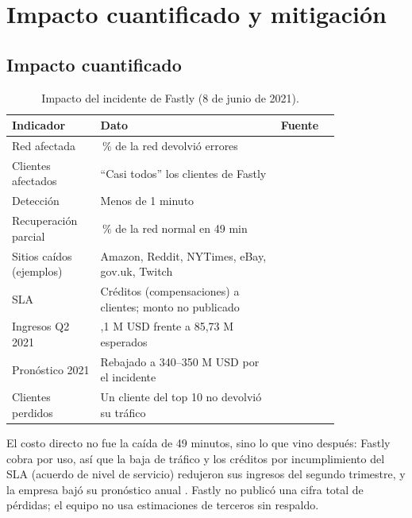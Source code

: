 
\section*{Impacto cuantificado y mitigación}

\subsection*{Impacto cuantificado}

\begin{table}[h]
\centering
\small
\begin{tabular}{@{}>{\raggedright\arraybackslash}p{0.27\linewidth}>{\raggedright\arraybackslash}p{0.55\linewidth}l@{}}
\toprule
\textbf{Indicador} & \textbf{Dato} & \textbf{Fuente} \\
\midrule
Red afectada & 85\,\% de la red devolvió errores & \cite{fastly2021} \\
Clientes afectados & ``Casi todos'' los clientes de Fastly & \cite{fastly2021q2} \\
Detección & Menos de 1 minuto & \cite{fastly2021q2} \\
Recuperación parcial & 95\,\% de la red normal en 49 min & \cite{fastly2021} \\
Sitios caídos (ejemplos) & Amazon, Reddit, NYTimes, eBay, gov.uk, Twitch & \cite{medina2021thousandeyes,cnbc2021q2} \\
SLA & Créditos (compensaciones) a clientes; monto no publicado & \cite{fastly2021q2} \\
Ingresos Q2 2021 & 85,1 M USD frente a 85,73 M esperados & \cite{cnbc2021q2} \\
Pronóstico 2021 & Rebajado a 340--350 M USD por el incidente & \cite{fastly2021q2} \\
Clientes perdidos & Un cliente del top 10 no devolvió su tráfico & \cite{fastly2021q2} \\
\bottomrule
\end{tabular}
\caption{Impacto del incidente de Fastly (8 de junio de 2021).}
\end{table}

El costo directo no fue la caída de 49 minutos, sino lo que vino después: Fastly
cobra por uso, así que la baja de tráfico y los créditos por incumplimiento del
SLA (acuerdo de nivel de servicio) redujeron sus ingresos del segundo trimestre,
y la empresa bajó su pronóstico anual \cite{fastly2021q2}. Fastly no publicó una
cifra total de pérdidas; el equipo no usa estimaciones de terceros sin respaldo.

